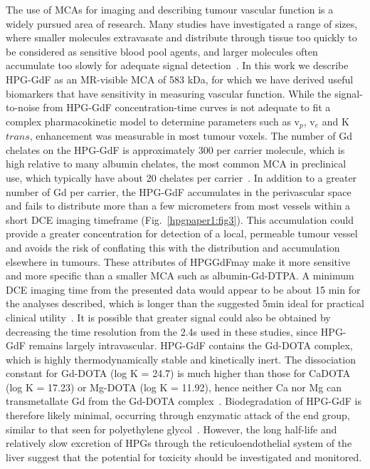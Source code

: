 The use of MCAs for imaging and describing tumour vascular function is a widely pursued area of research.
Many studies have investigated a range of sizes, where smaller molecules extravasate and distribute through tissue too quickly to be considered as sensitive blood pool agents, and larger molecules often accumulate too slowly for adequate signal detection~\cite{Kyle:2007ch,Tang:2013fi,Sourbron:2011ce}.
In this work we describe HPG-GdF as an MR-visible MCA of 583 kDa, for which we have derived useful biomarkers that have sensitivity in measuring vascular function.
While the signal-to-noise from HPG-GdF concentration-time curves is not adequate to fit a complex pharmacokinetic model to determine parameters such as v$_p$, v$_e$ and K${trans}$, enhancement was measurable in most tumour voxels.
The number of Gd chelates on the HPG-GdF is approximately 300 per carrier molecule, which is high relative to many albumin chelates, the most common MCA in preclinical use, which typically have about 20 chelates per carrier~\cite{Ogan:1987tg}.
In addition to a greater number of Gd per carrier, the HPG-GdF accumulates in the perivascular space and fails to distribute more than a few micrometers from most vessels within a short DCE imaging timeframe (Fig.~\ref{hpgpaper1:fig3}).
This accumulation could provide a greater concentration for detection of a local, permeable tumour vessel and avoids the risk of conflating this with the distribution and accumulation elsewhere in tumours.
These attributes of HPGGdFmay make it more sensitive and more specific than a smaller MCA such as albumin-Gd-DTPA.
A minimum DCE imaging time from the presented data would appear to be about 15 min for the analyses described, which is longer than the suggested 5min ideal for practical clinical utility~\cite{Turetschek:2004bw}.
It is possible that greater signal could also be obtained by decreasing the time resolution from the 2.4s used in these studies, since HPG-GdF remains largely intravascular.
HPG-GdF contains the Gd-DOTA complex, which is highly thermodynamically stable and kinetically inert.
The dissociation constant for Gd-DOTA (log K = 24.7) is much higher than those for CaDOTA (log K = 17.23) or Mg-DOTA (log K = 11.92), hence neither Ca nor Mg can transmetallate Gd from the Gd-DOTA complex~\cite{Baranyai:2005ta}.
Biodegradation of HPG-GdF is therefore likely minimal, occurring through enzymatic attack of the end group, similar to that seen for polyethylene glycol~\cite{Kawai:2002fc}.
However, the long half-life and relatively slow excretion of HPGs through the reticuloendothelial system of the liver suggest that the potential for toxicity should be investigated and monitored.

